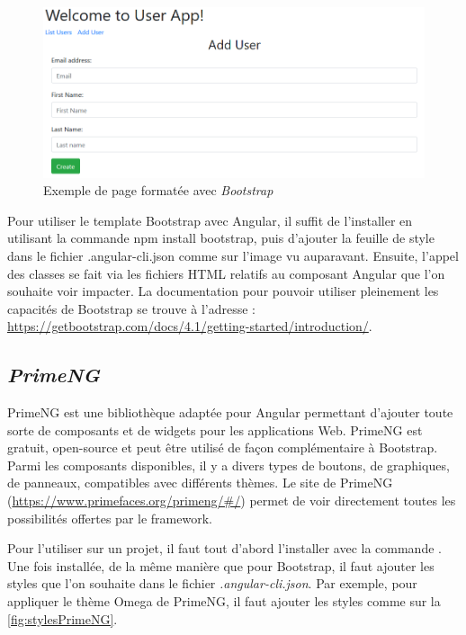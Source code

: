 \documentclass{polytech/polytech}
\begin{document}
\begin{figure}
	\includegraphics[scale=0.6]{images/bootstrap_exemple}
	\caption{Exemple de page formatée avec \textit{Bootstrap}}
	\label{fig:boostrapExemple}
\end{figure}

Pour utiliser le template Bootstrap avec Angular, il suffit de l’installer en utilisant la commande npm install bootstrap, puis d’ajouter la feuille de style dans le fichier .angular-cli.json comme sur l’image vu auparavant. Ensuite, l’appel des classes se fait via les fichiers HTML relatifs au composant Angular que l’on souhaite voir impacter. La documentation pour pouvoir utiliser pleinement les capacités de Bootstrap se trouve à l’adresse : \url{https://getbootstrap.com/docs/4.1/getting-started/introduction/}.

\subsection{\textit{PrimeNG}}

PrimeNG est une bibliothèque adaptée pour Angular permettant d’ajouter toute sorte de composants et de widgets pour les applications Web. PrimeNG est gratuit, open-source et peut être utilisé de façon complémentaire à Bootstrap. Parmi les composants disponibles, il y a divers types de boutons, de graphiques, de panneaux, compatibles avec différents thèmes. Le site de PrimeNG (\url{https://www.primefaces.org/primeng/#/}) permet de voir directement toutes les possibilités offertes par le framework. 

Pour l’utiliser sur un projet, il faut tout d’abord l’installer avec la commande . Une fois installée, de la même manière que pour Bootstrap, il faut ajouter les styles que l’on souhaite dans le fichier \textit{.angular-cli.json}. Par exemple, pour appliquer le thème Omega de PrimeNG, il faut ajouter les styles comme sur la \autoref{fig:stylesPrimeNG}. 
\end{document}

